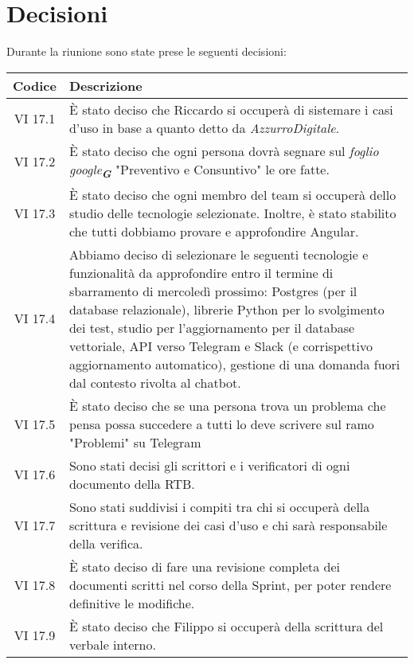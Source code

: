 
\section{Decisioni}

Durante la riunione sono state prese le seguenti decisioni:

\vspace{0.5cm}

\begin{table}[htbp]
    \centering
    \begin{tabular}{|c|p{}|}
        \hline
        \rowcolor[gray]{0.75}
        \textbf{Codice} & \textbf{Descrizione}\\
        \hline
        VI 17.1 & È stato deciso che Riccardo si occuperà di sistemare i casi d'uso in base a quanto detto da \emph{AzzurroDigitale}. \\
        \hline
        VI 17.2 & È stato deciso che ogni persona dovrà segnare sul  \emph{foglio google}\textsubscript{\textit{\textbf{G}}} "Preventivo e Consuntivo" le ore fatte. \\
        \hline
        VI 17.3 & È stato deciso che ogni membro del team si occuperà dello studio delle tecnologie selezionate. Inoltre, è stato stabilito che tutti dobbiamo provare e approfondire Angular. \\
        \hline
        VI 17.4 & Abbiamo deciso di selezionare le seguenti tecnologie e funzionalità da approfondire entro il termine di sbarramento di mercoledì prossimo: Postgres (per il database relazionale), librerie Python per lo svolgimento dei test, studio per l'aggiornamento per il database vettoriale, API verso Telegram e Slack (e corrispettivo aggiornamento automatico), gestione di una domanda fuori dal contesto rivolta al chatbot.  \\
        \hline
        VI 17.5 & È stato deciso che se una persona trova un problema che pensa possa succedere a tutti lo deve scrivere sul ramo "Problemi" su Telegram \\
        \hline
        VI 17.6 & Sono stati decisi gli scrittori e i verificatori di ogni documento della RTB. \\
        \hline
        VI 17.7 & Sono stati suddivisi i compiti tra chi si occuperà della scrittura e revisione dei casi d'uso e chi sarà responsabile della verifica.\\
        \hline
        VI 17.8 & È stato deciso di fare una revisione completa dei documenti scritti nel corso della Sprint, per poter rendere definitive le modifiche.\\
        \hline
        VI 17.9 & È stato deciso che Filippo si occuperà della scrittura del verbale interno.\\
        \hline
    \end{tabular}
\end{table}